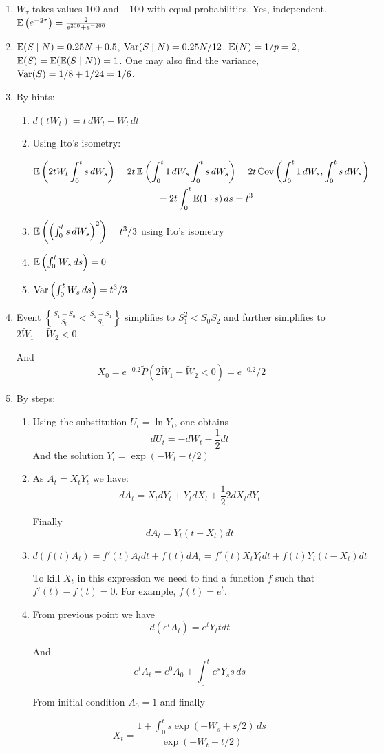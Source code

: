 \documentclass[12pt, a4paper]{article}
\begin{document}
\begin{enumerate}
\item $W_{\tau}$ takes values $100$ and $-100$ with equal probabilities. Yes, independent. $\operatorname{\mathbb{E}}\left(  e^{-2\tau} \right) = \frac{2}{e^{200}+e^{-200}}$
\item $\operatorname{\mathbb{E}}(S \mid N)=0.25N+0.5$, $\operatorname{Var}(S \mid N)=0.25N/12$, $\operatorname{\mathbb{E}}(N)=1/p=2$, $\operatorname{\mathbb{E}}(S)=\operatorname{\mathbb{E}}(\operatorname{\mathbb{E}}(S \mid N))=1$. 
One may also find the variance, $\operatorname{Var}(S)=1/8+1/24=1/6$.
\item By hints:
\begin{enumerate}
\item $d(tW_t)=t \, dW_t+W_t \, dt$
\item Using Ito's isometry:

\begin{multline}
\operatorname{\mathbb{E}}\left(2t W_t\int_0^t s \, dW_s\right) = 2t \operatorname{\mathbb{E}}\left(\int_0^t 1 \, dW_s \int_0^t s \, dW_s\right) =
2t \operatorname{Cov}\left(\int_0^t 1 \, dW_s, \int_0^t s \, dW_s\right) = \\
= 2t \int_0^t \operatorname{\mathbb{E}}( 1 \cdot s) \, ds = t^3
\end{multline}



\item $\operatorname{\mathbb{E}}\left(\left(\int_0^t s \, dW_s\right)^2 \right)=t^3/3$ using Ito's isometry
\item $\operatorname{\mathbb{E}}\left(  \int_0^t W_s \, ds  \right)=0$
\item $\operatorname{Var}\left(  \int_0^t W_s \, ds  \right)=t^3/3$
\end{enumerate}
\item Event $\left\{ \frac{S_1-S_0}{S_0} < \frac{S_2-S_1}{S_1} \right\}$ simplifies to $S_1^2<S_0 S_2$ and further simplifies to $2\tilde{W}_1 - \tilde{W}_2 < 0$.

And
\[
X_0=e^{-0.2}\tilde{P}(2\tilde{W}_1 - \tilde{W}_2 < 0) = e^{-0.2}/2
\]

\item By steps:

\begin{enumerate}
\item Using the substitution $U_t=\ln Y_t$, one obtains
\[
dU_t= - dW_t - \frac{1}{2}dt
\]
And the solution $Y_t=\exp(-W_t-t/2)$
\item As $A_t = X_t Y_t$ we have:
\[
dA_t = X_t dY_t + Y_t dX_t + \frac{1}{2} 2 dX_t dY_t
\]

Finally
\[
dA_t= Y_t (t-X_t)dt
\]
\item
\[
d(f(t)A_t) = f'(t) A_t dt + f(t) dA_t = f'(t) X_t Y_t dt + f(t)Y_t (t - X_t)dt
\]

To kill $X_t$ in this expression we need to find a function $f$ such that $f'(t)- f(t)=0$. For example, $f(t)=e^t$.
\item From previous point we have
\[
d(e^t A_t) = e^t Y_t t dt
\]

And
\[
e^t A_t = e^0 A_0 + \int_0^t e^s Y_s s \, ds
\]

From initial condition $A_0=1$ and finally

\[
X_t=\frac{1+\int_0^t s \exp(-W_s+s/2) \, ds}{ \exp(-W_t +t/2 )}
\]
\end{enumerate}


\end{enumerate}
\end{document}

